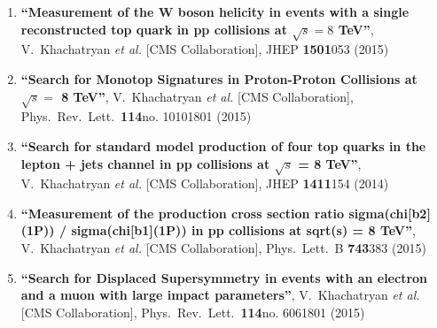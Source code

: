 \begin{enumerate}
\item%
{\bf ``Measurement of the W boson helicity in events with a single reconstructed top quark in pp collisions at $ \sqrt{s}=8 $ TeV''}, 
  V.~Khachatryan {\it et al.}  [CMS Collaboration], 
JHEP {\bf 1501}053 (2015) %


\item%
{\bf ``Search for Monotop Signatures in Proton-Proton Collisions at $\sqrt s =$ 8 TeV''}, 
  V.~Khachatryan {\it et al.}  [CMS Collaboration], 
Phys.\ Rev.\ Lett.\  {\bf 114}no. 10101801 (2015) %


\item%
{\bf ``Search for standard model production of four top quarks in the lepton + jets channel in pp collisions at $\sqrt{s}$ = 8 TeV''}, 
  V.~Khachatryan {\it et al.}  [CMS Collaboration], 
JHEP {\bf 1411}154 (2014) %


\item%
{\bf ``Measurement of the production cross section ratio sigma(chi[b2](1P)) / sigma(chi[b1](1P)) in pp collisions at sqrt(s) = 8 TeV''}, 
  V.~Khachatryan {\it et al.}  [CMS Collaboration], 
Phys.\ Lett.\ B {\bf 743}383 (2015) %


\item%
{\bf ``Search for Displaced Supersymmetry in events with an electron and a muon with large impact parameters''}, 
  V.~Khachatryan {\it et al.}  [CMS Collaboration], 
Phys.\ Rev.\ Lett.\  {\bf 114}no. 6061801 (2015) %



\end{enumerate}
